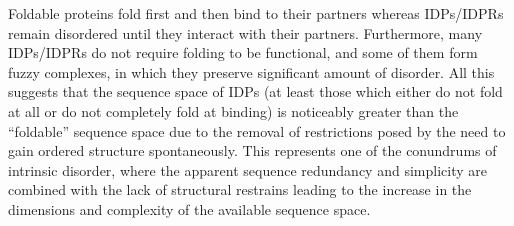 Foldable proteins fold first and then bind to their partners whereas IDPs/IDPRs remain disordered until they interact with their partners. 
Furthermore, many IDPs/IDPRs do not require folding to be functional, and some of them form fuzzy complexes, in which they preserve significant amount of disorder. 
All this suggests that the sequence space of IDPs (at least those which either do not fold at all or do not completely fold at binding) 
is noticeably greater than the “foldable” sequence space due to the removal of restrictions posed by the need to gain ordered structure spontaneously. 
This represents one of the conundrums of intrinsic disorder, where the apparent sequence redundancy and simplicity are combined with the lack of structural restrains leading to the increase in the dimensions and complexity of the
available sequence space.


% 

% 
% 
% 
% 
% 
% 



